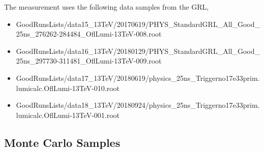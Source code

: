 The measurement uses the following data samples from the GRL,
\begin{itemize}
\footnotesize
\item{ { GoodRunsLists/data15\_13TeV/20170619/PHYS\_StandardGRL\_All\_Good\_25ns\_276262-284484\_OflLumi-13TeV-008.root}}
\item{  {GoodRunsLists/data16\_13TeV/20180129/PHYS\_StandardGRL\_All\_Good\_25ns\_297730-311481\_OflLumi-13TeV-009.root}}
\item{{ GoodRunsLists/data17\_13TeV/20180619/physics\_25ns\_Triggerno17e33prim.lumicalc.OflLumi-13TeV-010.root}}
\item{{GoodRunsLists/data18\_13TeV/20180924/physics\_25ns\_Triggerno17e33prim.lumicalc.OflLumi-13TeV-001.root}}
\end{itemize}

\normalsize

\subsection{Monte Carlo Samples }
\label{subsec:MCSamples}

